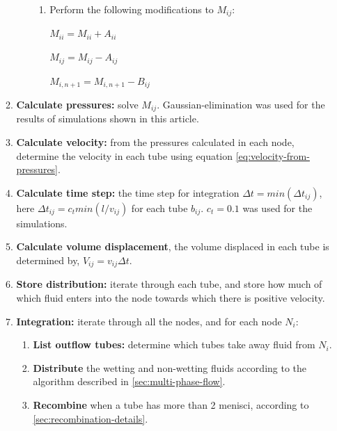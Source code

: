 \documentclass{crm-article}
\begin{document}
\begin{enumerate}
\begin{enumerate}
\begin{enumerate}
\begin{enumerate}
							\item Perform the following modifications to $M_{ij}$:
							
							$M_{ii} = M_{ii} + A_{ii}$
							
							$M_{ij} = M_{ij} - A_{ij}$
							
							$M_{i,n + 1} = M_{i,n + 1} - B_{ij}$
						\end{enumerate}
					\end{enumerate}
					
					\item \textbf{Calculate pressures:} solve $M_{ij}$. Gaussian-elimination was used for the results of simulations shown in this article.
					
					\item \textbf{Calculate velocity:} from the pressures calculated in each node, determine the velocity in each tube using equation \ref{eq:velocity-from-pressures}.
					
					\item \textbf{Calculate time step:} the time step for integration $\Delta t = min(\Delta t_{ij})$, here $\Delta t_{ij} = c_{t} min(l/v_{ij})$ for each tube $b_{ij}$. $c_{t} = 0.1$ was used for the simulations.
					
					\item \textbf{Calculate volume displacement}, the volume displaced in each tube is determined by, $V_{ij} = v_{ij} \Delta t$.
					
					\item \textbf{Store distribution:} iterate through each tube, and store how much of which fluid enters into the node towards which there is positive velocity.
					
					\item \textbf{Integration:} iterate through all the nodes, and for each node $N_i$: 
					
					\begin{enumerate}
						\item \textbf{List outflow tubes:} determine which tubes take away fluid from $N_i$.
						
						\item \textbf{Distribute} the wetting and non-wetting fluids according to the algorithm described in \ref{sec:multi-phase-flow}.
						
						\item \textbf{Recombine} when a tube has more than 2 menisci, according to \ref{sec:recombination-details}.
					\end{enumerate}
						

\end{enumerate}
\end{enumerate}
\end{document}

